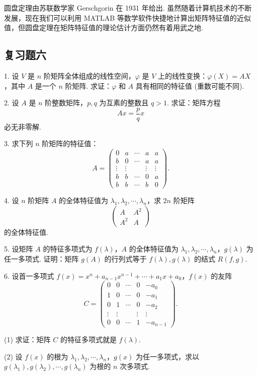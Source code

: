 \documentclass[UTF8, 12pt, fontset=fandol, oneside]{ctexart}
\begin{document}
圆盘定理由苏联数学家 Gerschgorin 在 1931 年给出. 虽然随着计算机技术的不断发展，现在我们可以利用 MATLAB 等数学软件快捷地计算出矩阵特征值的近似值，但圆盘定理在矩阵特征值的理论估计方面仍然有着用武之地.

\subsection*{复习题六}

1. 设 $V$ 是 $n$ 阶矩阵全体组成的线性空间，$\varphi$ 是 $V$ 上的线性变换：$\varphi(X)=AX$，其中 $A$ 是一个 $n$ 阶矩阵. 求证：$\varphi$ 和 $A$ 具有相同的特征值 (重数可能不同).

2. 设 $A$ 是 $n$ 阶整数矩阵，$p,q$ 为互素的整数且 $q>1$. 求证：矩阵方程
\[
Ax=\frac{p}{q}x
\]
必无非零解.

3. 求下列 $n$ 阶矩阵的特征值：
\[
A=\left(\begin{array}{ccccc}
0 & a & \cdots & a & a\\
b & 0 & \cdots & a & a\\
\vdots & \vdots & & \vdots & \vdots\\
b & b & \cdots & 0 & a\\
b & b & \cdots & b & 0
\end{array}\right).
\]

4. 设 $n$ 阶矩阵 $A$ 的全体特征值为 $\lambda_1,\lambda_2,\cdots,\lambda_n$，求 $2n$ 阶矩阵
\[
\left(\begin{array}{cc}
A & A^2\\
A^2 & A
\end{array}\right)
\]
的全体特征值.

5. 设矩阵 $A$ 的特征多项式为 $f(\lambda)$，$A$ 的全体特征值为 $\lambda_1,\lambda_2,\cdots,\lambda_n$，$g(\lambda)$ 为任一多项式. 证明：矩阵 $g(A)$ 的行列式等于 $f(\lambda),g(\lambda)$ 的结式 $R(f,g)$.

6. 设首一多项式 $f(x)=x^n+a_{n-1}x^{n-1}+\cdots+a_1x+a_0$，$f(x)$ 的友阵
\[
C=\left(\begin{array}{ccccc}
0 & 0 & \cdots & 0 & -a_0\\
1 & 0 & \cdots & 0 & -a_1\\
0 & 1 & \cdots & 0 & -a_2\\
\vdots & \vdots & & \vdots & \vdots\\
0 & 0 & \cdots & 1 & -a_{n-1}
\end{array}\right).
\]

(1) 求证：矩阵 $C$ 的特征多项式就是 $f(\lambda)$.

(2) 设 $f(x)$ 的根为 $\lambda_1,\lambda_2,\cdots,\lambda_n$，$g(x)$ 为任一多项式，求以 $g(\lambda_1),g(\lambda_2),\cdots,g(\lambda_n)$ 为根的 $n$ 次多项式.
\end{document}
